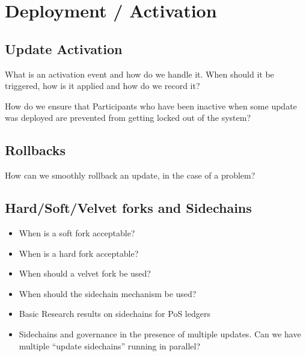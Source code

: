 \section{Deployment / Activation}
\subsection*{Update Activation}
What is an activation event and how do we handle it. When should it be triggered, how is it applied and how do we record it?

How do we ensure that Participants who have been inactive when some update was deployed are  prevented from getting locked out of the system?

\subsection*{Rollbacks}
How can we smoothly rollback an update, in the case of a problem?

\subsection*{Hard/Soft/Velvet forks and Sidechains}
\begin{itemize}
\item When is a soft fork acceptable?
\item When is a hard fork acceptable?
\item When should a velvet fork be used?
\item When should the sidechain mechanism be used?
\item Basic Research results on sidechains for PoS ledgers
\item Sidechains and governance in the presence of multiple updates. Can we have multiple “update sidechains” running in parallel?
\end{itemize}
